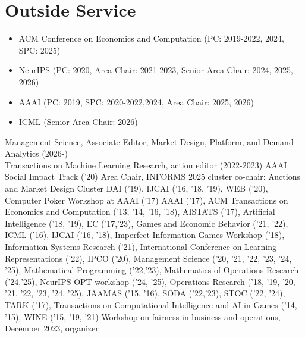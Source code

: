 \documentclass[11pt,a4paper,sans]{moderncv}        %
\begin{document}
\section{Outside Service}
{
  \begin{itemize}
    \item ACM Conference on Economics and Computation (PC: 2019-2022, 2024, SPC: 2025)
    \item NeurIPS (PC: 2020, Area Chair: 2021-2023, Senior Area Chair: 2024,
      2025, 2026)
    \item AAAI (PC: 2019, SPC: 2020-2022,2024, Area Chair: 2025, 2026)
    \item ICML (Senior Area Chair: 2026)
  \end{itemize}
}
{
  Management Science, Associate Editor, Market Design, Platform, and Demand Analytics (2026-)\\
  Transactions on Machine Learning Research, action editor (2022-2023)
}
{
  AAAI Social Impact Track ('20) Area Chair,
  INFORMS 2025 cluster co-chair: Auctions and Market Design Cluster
}
{
  DAI ('19),
  IJCAI ('16, '18, '19),
  WEB ('20),
  Computer Poker Workshop at AAAI ('17)
}
{
  AAAI ('17),
  ACM Transactions on Economics and Computation ('13, '14, '16, '18),
  AISTATS ('17),
  Artificial Intelligence ('18, '19),
  EC ('17,'23),
  Games and Economic Behavior ('21, '22),
  ICML ('16),
  IJCAI ('16, '18),
  Imperfect-Information Games Workshop ('18),
  Information Systems Research ('21),
  International Conference on Learning Representations ('22),
  IPCO ('20),
  Management Science ('20, '21, '22, '23, '24, '25),
  Mathematical Programming ('22,'23),
  Mathematics of Operations Research ('24,'25),
  NeurIPS OPT workshop ('24, '25),
  Operations Research ('18, '19, '20, '21, '22, '23, '24, '25),
  JAAMAS ('15, '16),
  SODA ('22,'23),
  STOC ('22, '24),
  TARK ('17),
  Transactions on Computational Intelligence and AI in Games ('14, '15),
  WINE ('15, '19, '21)
}
{
  Workshop on fairness in business and operations, December 2023, organizer
}
\end{document}
